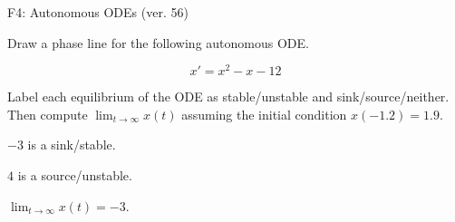 \begin{exercise}
  \begin{exerciseTitle}F4: Autonomous ODEs (ver. 56)\end{exerciseTitle}
  \begin{exerciseStatement}
    

      Draw a phase line for the following 
      autonomous ODE.
    

    
\[x'= x^{2} - x - 12\]

    

      Label each equilibrium of the ODE
      as stable/unstable and sink/source/neither.
      Then compute \(\lim_{t\to\infty}x(t)\)
      assuming the initial condition
      \(x( -1.2 )= 1.9\).
    

  \end{exerciseStatement}
  \begin{exerciseAnswer}
    

      \(-3\) is a sink/stable.
      
      \(4\) is a source/unstable.
    

    

      \(\lim_{t\to\infty}x(t)=-3\).
    

  \end{exerciseAnswer}
\end{exercise}